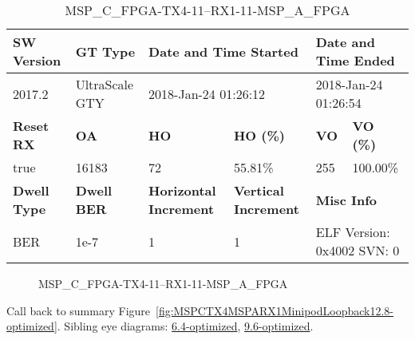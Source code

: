 \begin{table}[h]
\centering
\caption{MSP\_C\_FPGA-TX4-11--RX1-11-MSP\_A\_FPGA}
\label{tab:MSPCFPGATX411RX111MSPAFPGA12.8-optimized}
\begin{tabular}{@{}|l|l|l|l|l|l|@{}}
\toprule
\textbf{SW Version}                & \textbf{GT Type}   & \multicolumn{2}{l|}{\textbf{Date and Time Started}}            & \multicolumn{2}{l|}{\textbf{Date and Time Ended}}        \\ \midrule
2017.2                       & UltraScale GTY          & \multicolumn{2}{l|}{2018-Jan-24 01:26:12}                   & \multicolumn{2}{l|}{2018-Jan-24 01:26:54}               \\ \midrule
\textbf{Reset RX}                  & \textbf{OA} & \textbf{HO}   & \textbf{HO (\%)} & \textbf{VO} & \textbf{VO (\%)} \\ \midrule
true & 16183        & 72          & 55.81\%        & 255        & 100.00\%       \\ \midrule
\textbf{Dwell Type}                & \textbf{Dwell BER} & \textbf{Horizontal Increment} & \textbf{Vertical Increment}    & \multicolumn{2}{l|}{\textbf{Misc Info}}                  \\ \midrule
BER                            & 1e-7        & 1        & 1           & \multicolumn{2}{l|}{ELF Version: 0x4002 SVN: 0}                         \\ \bottomrule
\end{tabular}
\end{table}

\begin{figure}[h]
\caption{MSP\_C\_FPGA-TX4-11--RX1-11-MSP\_A\_FPGA} \label{fig:MSPCFPGATX411RX111MSPAFPGA12.8-optimized}
\end{figure}

Call back to summary Figure~\ref{fig:MSPCTX4MSPARX1MinipodLoopback12.8-optimized}.
Sibling eye diagrams: \hyperref[sec:MSPCFPGATX411RX111MSPAFPGA6.4-optimized]{6.4-optimized}, \hyperref[sec:MSPCFPGATX411RX111MSPAFPGA9.6-optimized]{9.6-optimized}.

\clearpage
\newpage

